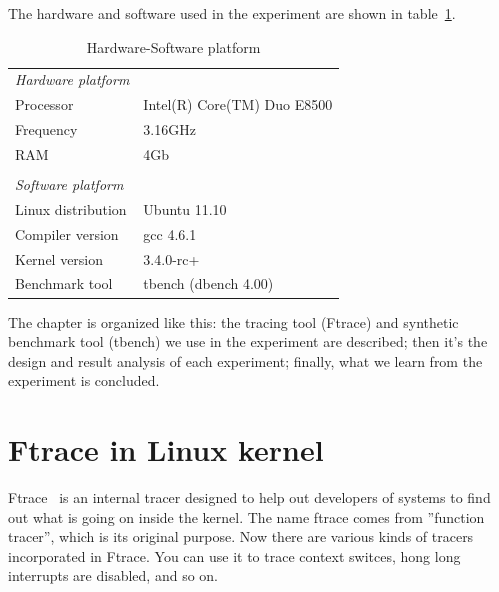 The hardware and software used in the experiment are shown in 
table~\ref{tab:exp_setup}.
\begin{table}[H]%
  \centering
  \begin{tabular}{ll}\hline
	\emph{Hardware platform}\hspace{4cm}		& 	\\
	Processor			& Intel(R) Core(TM) Duo E8500	 \\
	Frequency			& 3.16GHz\\
	RAM				& 4Gb 	  \\	
					&	\\	
	\emph{Software platform}\hspace{4cm}		& 	\\
	Linux distribution		& Ubuntu 11.10\\
	Compiler version		& gcc 4.6.1\\
	Kernel version			& 3.4.0-rc+ \\
	Benchmark tool			& tbench (dbench 4.00) \\\hline
  \end{tabular}
  \caption{Hardware-Software platform}
  \label{tab:exp_setup}
\end{table}
The chapter is organized like this: the tracing tool (Ftrace) and 
synthetic benchmark tool (tbench) we use in the experiment are described; 
then it's the design and result analysis of each experiment; finally, 
what we learn from the experiment is concluded.

\section{Ftrace in Linux kernel}

Ftrace~\cite{ftrace} is an internal tracer designed to help out developers 
of systems to find out what is going on inside the kernel. The name ftrace 
comes from ''function tracer'', which is its original purpose.
Now there are various kinds of tracers incorporated in Ftrace.
You can use it to trace context switces, hong long interrupts 
are disabled, and so on.

